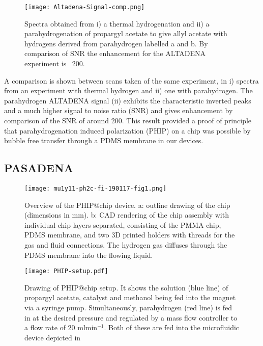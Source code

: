 \begin{figure}
  \begin{center}
  \texttt{[image: Altadena-Signal-comp.png]}
  \end{center}
  \caption{Spectra obtained from i) a thermal hydrogenation and ii) a parahydrogenation
  of propargyl acetate to give allyl acetate with hydrogens derived from parahydrogen labelled a and
  b. By comparison of SNR the enhancement for the ALTADENA experiment is ~200. }
  \label{fig:AltadenaResults}
\end{figure}

A comparison is shown between scans taken of the same experiment, in  i) spectra
from an experiment with thermal hydrogen and ii) one with parahydrogen. The parahydrogen
ALTADENA signal (ii) exhibits the characteristic inverted peaks and a much higher signal
to noise ratio (SNR) and gives enhancement by comparison of the SNR of around 200.
This result provided a proof of principle that parahydrogenation induced polarization (PHIP) on a chip
was possible by bubble free transfer through a PDMS membrane in our devices.

\subsection{PASADENA}

\begin{figure}
	\centering
	\texttt{[image: mu1y11-ph2c-fi-190117-fig1.png]}
	\caption{Overview of the PHIP@chip device.
    a: outline drawing of the chip (dimensions in mm).
		b: CAD rendering of the chip assembly with individual chip layers
		separated, consisting of the PMMA chip, PDMS membrane, and two 3D
		printed holders with threads for the gas and fluid connections.
    The hydrogen gas
		diffuses through the PDMS membrane into the flowing liquid.
		}
	\label{fig:phip@chip1}
\end{figure}

\begin{figure}
  \begin{center}
  \texttt{[image: PHIP-setup.pdf]}
  \end{center}
  \caption{Drawing of PHIP@chip setup. It shows the solution (blue line)
  of propargyl acetate, catalyst and methanol being fed into the magnet
  via a syringe pump. Simultaneously, parahydrogen (red line) is fed in
  at the desired pressure and regulated by a mass flow controller to a
  flow rate of 20 ml$\text{min}^{-1}$. Both of these are fed into the
  microfluidic device depicted in }
  \label{fig:SetUp}
\end{figure}

